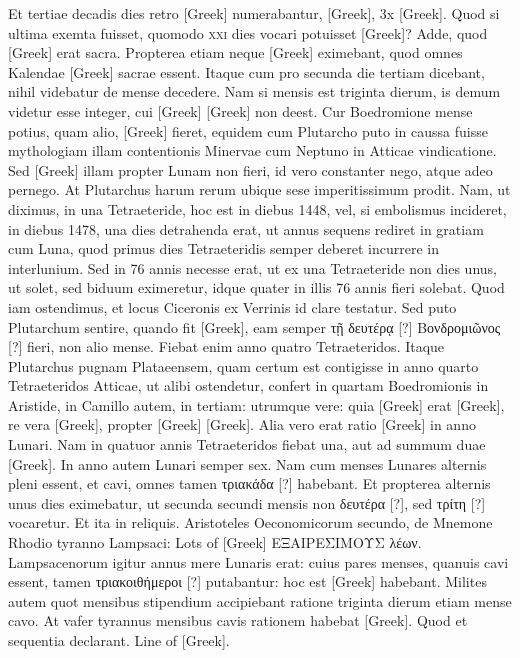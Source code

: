 Et tertiae decadis dies retro \textgreek{[Greek]}
 numerabantur, \textgreek{[Greek]},
\textgreek{3x [Greek]}.
Quod si ultima exemta fuisset,
quomodo \textsc{xxi} dies vocari potuisset \textgreek{[Greek]}?
Adde, quod
\textgreek{[Greek]} erat sacra.
Propterea etiam neque \textgreek{[Greek]} eximebant,
quod omnes Kalendae \textgreek{[Greek]} sacrae essent.
Itaque cum pro secunda
die tertiam dicebant, nihil videbatur de mense decedere.
Nam si
mensis est triginta dierum, is demum videtur esse integer,
 cui \textgreek{[Greek]}
\textgreek{[Greek]} non deest.
Cur Boedromione mense potius, quam alio,
\textgreek{[Greek]} fieret, equidem cum Plutarcho puto in caussa
 fuisse mythologiam
illam contentionis Minervae cum Neptuno in Atticae vindicatione.
Sed \textgreek{[Greek]} illam propter Lunam non fieri,
 id vero constanter
nego, atque adeo pernego.
At Plutarchus harum rerum ubique sese imperitissimum
prodit.
Nam, ut diximus, in una Tetraeteride, hoc est in
diebus 1448, vel, si embolismus incideret, in diebus 1478, una dies detrahenda
erat, ut annus sequens rediret in gratiam cum Luna, quod
primus dies Tetraeteridis semper deberet incurrere in interlunium.
Sed
in 76 annis necesse erat, ut ex una Tetraeteride non dies unus, ut solet,
sed biduum eximeretur, idque quater in illis 76 annis fieri solebat.
Quod
iam ostendimus, et locus Ciceronis ex Verrinis id clare testatur.
Sed
puto Plutarchum sentire, quando fit \textgreek{[Greek]},
 eam semper \textgreek{τῇ δευτέρᾳ [?]}
\textgreek{Βονδρομιῶνος [?]} fieri, non alio mense.
Fiebat enim anno quatro Tetraeteridos.
Itaque Plutarchus pugnam Plataeensem, quam certum est contigisse
in anno quarto Tetraeteridos Atticae, ut alibi ostendetur, confert
in quartam Boedromionis in Aristide, in Camillo autem, in tertiam:
utrumque vere: quia \textgreek{[Greek]} erat \textgreek{[Greek]},
 re vera \textgreek{[Greek]}, propter \textgreek{[Greek]}
\textgreek{[Greek]}.
Alia vero erat ratio \textgreek{[Greek]} in anno Lunari.
Nam in
quatuor annis Tetraeteridos fiebat una, aut ad summum duae \textgreek{[Greek]}.
In anno autem Lunari semper sex.
Nam cum menses Lunares alternis
pleni essent, et cavi, omnes tamen \textgreek{τριακάδα [?]} habebant.
Et propterea
alternis unus dies eximebatur, ut secunda secundi mensis non
 \textgreek{δευτέρα [?]},
sed \textgreek{τρίτη [?]} vocaretur.
Et ita in reliquis.
Aristoteles Oeconomicorum secundo,
de Mnemone Rhodio tyranno Lampsaci:
 \textgreek{Lots of [Greek] ΕΞΑΙΡΕΣΙΜΟΥΣ λέων}.
Lampsacenorum igitur annus
mere Lunaris erat: cuius pares menses, quanuis cavi essent, tamen
\textgreek{τριακοιθήμεροι [?]} putabantur: hoc est \textgreek{[Greek]}
 habebant.
Milites autem
quot mensibus stipendium accipiebant ratione triginta dierum etiam
mense cavo.
At vafer tyrannus mensibus cavis rationem habebat \textgreek{[Greek]}.
Quod et sequentia declarant.
\textgreek{Line of [Greek]}.


